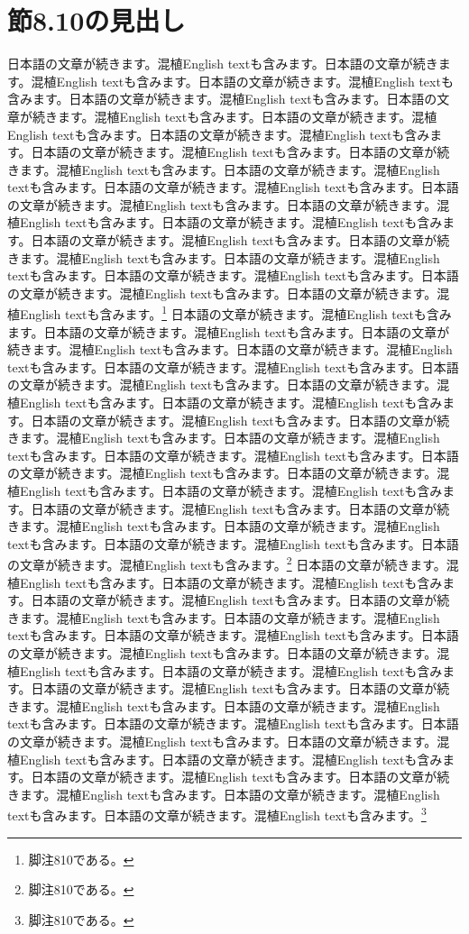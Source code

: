 \documentclass[pdflatex,book]{jlreq}
\begin{document}
\section{節8.10の見出し}
日本語の文章が続きます。混植English textも含みます。日本語の文章が続きます。混植English textも含みます。日本語の文章が続きます。混植English textも含みます。日本語の文章が続きます。混植English textも含みます。日本語の文章が続きます。混植English textも含みます。日本語の文章が続きます。混植English textも含みます。日本語の文章が続きます。混植English textも含みます。日本語の文章が続きます。混植English textも含みます。日本語の文章が続きます。混植English textも含みます。日本語の文章が続きます。混植English textも含みます。日本語の文章が続きます。混植English textも含みます。日本語の文章が続きます。混植English textも含みます。日本語の文章が続きます。混植English textも含みます。日本語の文章が続きます。混植English textも含みます。日本語の文章が続きます。混植English textも含みます。日本語の文章が続きます。混植English textも含みます。日本語の文章が続きます。混植English textも含みます。日本語の文章が続きます。混植English textも含みます。日本語の文章が続きます。混植English textも含みます。日本語の文章が続きます。混植English textも含みます。\footnote{脚注810である。}
日本語の文章が続きます。混植English textも含みます。日本語の文章が続きます。混植English textも含みます。日本語の文章が続きます。混植English textも含みます。日本語の文章が続きます。混植English textも含みます。日本語の文章が続きます。混植English textも含みます。日本語の文章が続きます。混植English textも含みます。日本語の文章が続きます。混植English textも含みます。日本語の文章が続きます。混植English textも含みます。日本語の文章が続きます。混植English textも含みます。日本語の文章が続きます。混植English textも含みます。日本語の文章が続きます。混植English textも含みます。日本語の文章が続きます。混植English textも含みます。日本語の文章が続きます。混植English textも含みます。日本語の文章が続きます。混植English textも含みます。日本語の文章が続きます。混植English textも含みます。日本語の文章が続きます。混植English textも含みます。日本語の文章が続きます。混植English textも含みます。日本語の文章が続きます。混植English textも含みます。日本語の文章が続きます。混植English textも含みます。日本語の文章が続きます。混植English textも含みます。\footnote{脚注810である。}
日本語の文章が続きます。混植English textも含みます。日本語の文章が続きます。混植English textも含みます。日本語の文章が続きます。混植English textも含みます。日本語の文章が続きます。混植English textも含みます。日本語の文章が続きます。混植English textも含みます。日本語の文章が続きます。混植English textも含みます。日本語の文章が続きます。混植English textも含みます。日本語の文章が続きます。混植English textも含みます。日本語の文章が続きます。混植English textも含みます。日本語の文章が続きます。混植English textも含みます。日本語の文章が続きます。混植English textも含みます。日本語の文章が続きます。混植English textも含みます。日本語の文章が続きます。混植English textも含みます。日本語の文章が続きます。混植English textも含みます。日本語の文章が続きます。混植English textも含みます。日本語の文章が続きます。混植English textも含みます。日本語の文章が続きます。混植English textも含みます。日本語の文章が続きます。混植English textも含みます。日本語の文章が続きます。混植English textも含みます。日本語の文章が続きます。混植English textも含みます。\footnote{脚注810である。}
\end{document}
